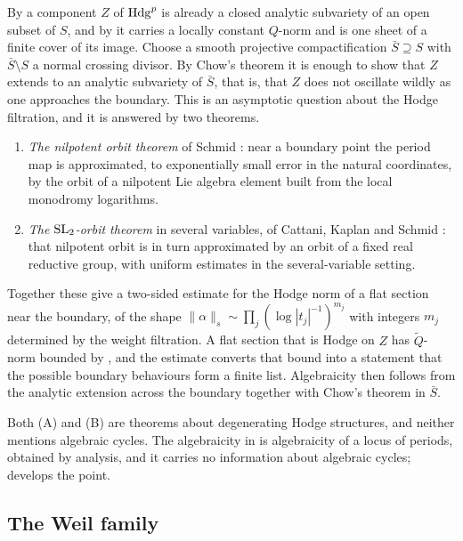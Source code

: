 By  a component $Z$ of $\mathrm{Hdg}^{p}$ is already a closed
analytic subvariety of an open subset of $S$, and by  it
carries a locally constant $Q$-norm and is one sheet of a finite cover of its
image. Choose a smooth projective compactification $\bar S\supseteq S$ with
$\bar S\setminus S$ a normal crossing divisor. By Chow's theorem it is enough
to show that $Z$ extends to an analytic subvariety of $\bar S$, that is, that
$Z$ does not oscillate wildly as one approaches the boundary. This is an
asymptotic question about the Hodge filtration, and it is answered by two
theorems.

\begin{enumerate}[label=\textup{(\Alph*)},leftmargin=2.2em]
\item \emph{The nilpotent orbit theorem} of Schmid \cite{Sch73}: near a
  boundary point the period map is approximated, to exponentially small error
  in the natural coordinates, by the orbit of a nilpotent Lie algebra element
  built from the local monodromy logarithms.
\item \emph{The $\operatorname{SL}_{2}$-orbit theorem} in several variables, of Cattani,
  Kaplan and Schmid \cite{CKS86}: that nilpotent orbit is in turn approximated
  by an orbit of a fixed real reductive group, with uniform estimates in the
  several-variable setting.
\end{enumerate}

Together these give a two-sided estimate for the Hodge norm of a flat section
near the boundary, of the shape $\|\alpha\|_{s}\sim\prod_{j}(\log|t_{j}|^{-1})^{m_{j}}$
with integers $m_{j}$ determined by the weight filtration. A flat section that
is Hodge on $Z$ has $\tilde Q$-norm bounded by , and the
estimate converts that bound into a statement that the possible boundary
behaviours form a finite list. Algebraicity then follows from the analytic
extension across the boundary together with Chow's theorem in $\bar S$.

\begin{remark}\label{rem:cdkinputs}
Both (A) and (B) are theorems about degenerating Hodge structures, and
neither mentions algebraic cycles. The algebraicity in  is
algebraicity of a locus of periods, obtained by analysis, and it carries no
information about algebraic cycles;  develops the point.
\end{remark}

\subsection{The Weil family}

